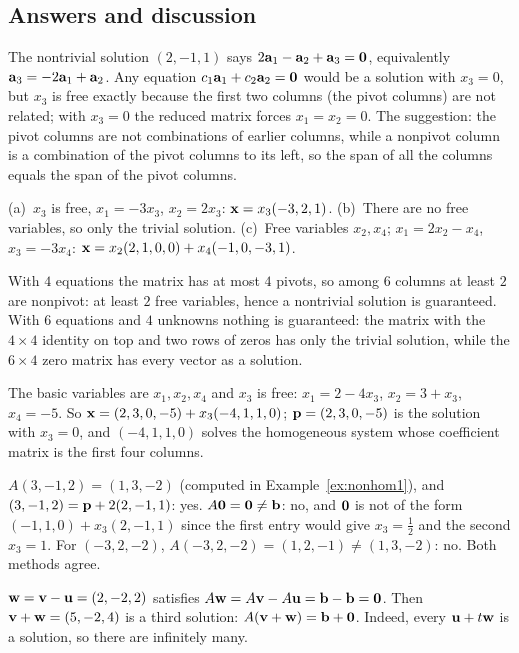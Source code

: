 \documentclass[11pt]{article}
\begin{document}
\subsection*{Answers and discussion}
\begin{description}[leftmargin=0pt,itemsep=5pt]
  \item[Pause and think \ref{think:freecols}.] The nontrivial solution $(2,-1,1)$ says $2\mathbf{a}_1-\mathbf{a}_2+\mathbf{a}_3=\mathbf{0}$, equivalently $\mathbf{a}_3=-2\mathbf{a}_1+\mathbf{a}_2$. Any equation $c_1\mathbf{a}_1+c_2\mathbf{a}_2=\mathbf{0}$ would be a solution with $x_3=0$, but $x_3$ is free exactly because the first two columns (the pivot columns) are not related; with $x_3=0$ the reduced matrix forces $x_1=x_2=0$. The suggestion: the pivot columns are not combinations of earlier columns, while a nonpivot column is a combination of the pivot columns to its left, so the span of all the columns equals the span of the pivot columns.
  \item[Knowledge Check \ref{kc:readoff}.] (a)~$x_3$ is free, $x_1=-3x_3$, $x_2=2x_3$: $\mathbf{x}=x_3(-3,2,1)$. (b)~There are no free variables, so only the trivial solution. (c)~Free variables $x_2,x_4$; $x_1=2x_2-x_4$, $x_3=-3x_4$: $\mathbf{x}=x_2(2,1,0,0)+x_4(-1,0,-3,1)$.
  \item[Knowledge Check \ref{kc:count}.] With $4$ equations the matrix has at most $4$ pivots, so among $6$ columns at least $2$ are nonpivot: at least $2$ free variables, hence a nontrivial solution is guaranteed. With $6$ equations and $4$ unknowns nothing is guaranteed: the matrix with the $4\times4$ identity on top and two rows of zeros has only the trivial solution, while the $6\times4$ zero matrix has every vector as a solution.
  \item[Knowledge Check \ref{kc:readoff2}.] The basic variables are $x_1,x_2,x_4$ and $x_3$ is free: $x_1=2-4x_3$, $x_2=3+x_3$, $x_4=-5$. So $\mathbf{x}=(2,3,0,-5)+x_3(-4,1,1,0)$; $\mathbf{p}=(2,3,0,-5)$ is the solution with $x_3=0$, and $(-4,1,1,0)$ solves the homogeneous system whose coefficient matrix is the first four columns.
  \item[Knowledge Check \ref{kc:member}.] $A(3,-1,2)=(1,3,-2)$ (computed in Example~\ref{ex:nonhom1}), and $(3,-1,2)=\mathbf{p}+2(2,-1,1)$: yes. $A\mathbf{0}=\mathbf{0}\neq\mathbf{b}$: no, and $\mathbf{0}$ is not of the form $(-1,1,0)+x_3(2,-1,1)$ since the first entry would give $x_3=\tfrac12$ and the second $x_3=1$. For $(-3,2,-2)$, $A(-3,2,-2)=(1,2,-1)\neq(1,3,-2)$: no. Both methods agree.
  \item[Knowledge Check \ref{kc:diff}.] $\mathbf{w}=\mathbf{v}-\mathbf{u}=(2,-2,2)$ satisfies $A\mathbf{w}=A\mathbf{v}-A\mathbf{u}=\mathbf{b}-\mathbf{b}=\mathbf{0}$. Then $\mathbf{v}+\mathbf{w}=(5,-2,4)$ is a third solution: $A(\mathbf{v}+\mathbf{w})=\mathbf{b}+\mathbf{0}$. Indeed, every $\mathbf{u}+t\mathbf{w}$ is a solution, so there are infinitely many.

\end{description}
\end{document}
